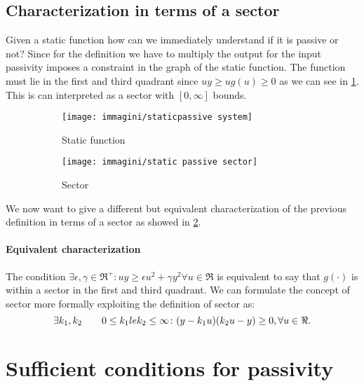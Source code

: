 \subsection{Characterization in terms of a sector}
Given a static function how can we immediately understand if it is passive or not? Since for the definition we have to multiply the output for the input passivity imposes a constraint in the graph of the static function. The function must lie in the first and third quadrant since $uy\ge ug(u)\ge 0$ as we can see in \ref{fig:sfunc}. This is can interpreted as a sector with $[0,\infty]$ bounds.
\begin{figure}[H]
	\centering
	\begin{subfigure}[b]{0.3\textwidth}
		\centering
		\texttt{[image: immagini/staticpassive system]}
		\caption{Static function}
		\label{fig:sfunc}
	\end{subfigure}
	\hfill
	\begin{subfigure}[b]{0.3\textwidth}
		\centering
		\texttt{[image: immagini/static passive sector]}
		\caption{Sector}
		\label{fig:sectpass}
	\end{subfigure}
	\hfill
	\label{fig:staticpass}
	\caption[]{}
\end{figure}
We now want to give a different but equivalent characterization of the previous definition in terms of a sector as showed in \ref{fig:sectpass}.
\paragraph{Equivalent characterization} The condition $\exists  \epsilon,\gamma\in \Re^+\colon uy \ge \epsilon u^2+\gamma y^2 \forall u \in \Re$ is equivalent to say that $g(\cdot)$ is within a sector in the first and third quadrant. We can formulate the concept of sector more formally exploiting the definition of sector as:
\[
\exists k_1,k_2 \qquad 0\le k_1\\le k_2 \le \infty \colon (y-k_1u)(k_2u-y)\ge0, \forall u \in \Re.
\]
\section{Sufficient conditions for passivity}
